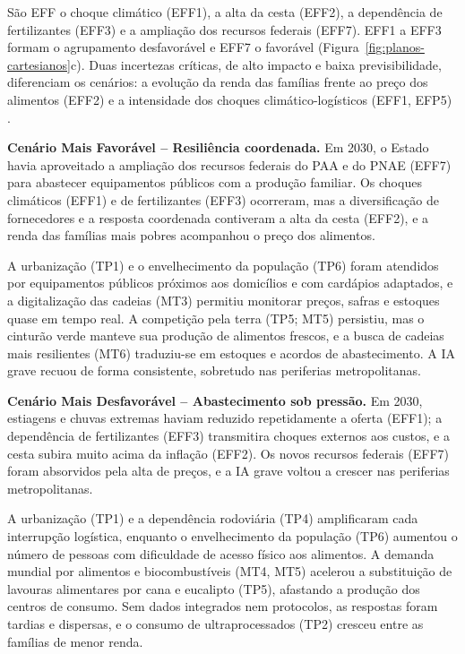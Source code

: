 \documentclass[
	12pt,				%
	openright,			%
	oneside,			%
	a4paper,			%
	chapter=TITLE,		%
	section=TITLE,		%
	english,			%
	french,				%
	spanish,			%
	brazil,				%
 ]{abntex2}
\begin{document}
São EFF o choque climático (EFF1), a alta da cesta (EFF2), a dependência de
fertilizantes (EFF3) e a ampliação dos recursos federais (EFF7). EFF1 a EFF3
formam o agrupamento desfavorável e EFF7 o favorável
(Figura~\ref{fig:planos-cartesianos}c). Duas incertezas críticas, de alto
impacto e baixa previsibilidade, diferenciam os cenários: a evolução da renda
das famílias frente ao preço dos alimentos (EFF2) e a intensidade dos choques
climático-logísticos (EFF1, EFP5) \cite[cap. 4]{araujo_cenarios2026}.

\textbf{Cenário Mais Favorável -- Resiliência coordenada.} Em 2030, o Estado
havia aproveitado a ampliação dos recursos federais do PAA e do PNAE (EFF7)
para abastecer equipamentos públicos com a produção familiar. Os choques
climáticos (EFF1) e de fertilizantes (EFF3) ocorreram, mas a diversificação de
fornecedores e a resposta coordenada contiveram a alta da cesta (EFF2), e a
renda das famílias mais pobres acompanhou o preço dos alimentos.

A urbanização (TP1) e o envelhecimento da população (TP6) foram atendidos por
equipamentos públicos próximos aos domicílios e com cardápios adaptados, e a
digitalização das cadeias (MT3) permitiu monitorar preços, safras e estoques
quase em tempo real. A competição pela terra (TP5; MT5) persistiu, mas o
cinturão verde manteve sua produção de alimentos frescos, e a busca de cadeias
mais resilientes (MT6) traduziu-se em estoques e acordos de abastecimento. A IA
grave recuou de forma consistente, sobretudo nas periferias metropolitanas.

\textbf{Cenário Mais Desfavorável -- Abastecimento sob pressão.} Em 2030,
estiagens e chuvas extremas haviam reduzido repetidamente a oferta (EFF1); a
dependência de fertilizantes (EFF3) transmitira choques externos aos custos, e a
cesta subira muito acima da inflação (EFF2). Os novos recursos federais (EFF7)
foram absorvidos pela alta de preços, e a IA grave voltou a crescer nas
periferias metropolitanas.

A urbanização (TP1) e a dependência rodoviária (TP4) amplificaram cada
interrupção logística, enquanto o envelhecimento da população (TP6) aumentou o
número de pessoas com dificuldade de acesso físico aos alimentos. A demanda
mundial por alimentos e biocombustíveis (MT4, MT5) acelerou a substituição de
lavouras alimentares por cana e eucalipto (TP5), afastando a produção dos
centros de consumo. Sem dados integrados nem protocolos, as respostas foram
tardias e dispersas, e o consumo de ultraprocessados (TP2) cresceu entre as
famílias de menor renda.
\end{document}
